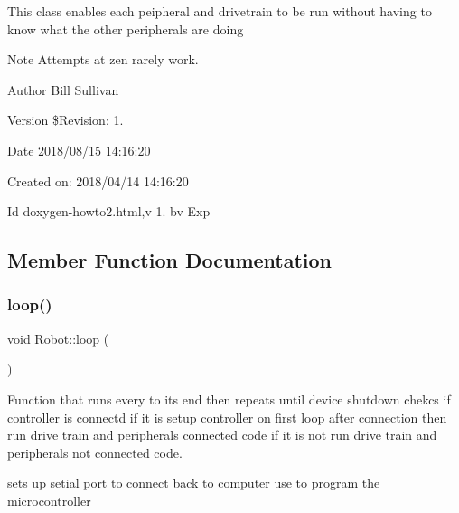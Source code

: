 This class enables each peipheral and drivetrain to be run without having to know what the other peripherals are doing

\begin{DoxyNote}{Note}
Attempts at zen rarely work.
\end{DoxyNote}
\begin{DoxyAuthor}{Author}
Bill Sullivan
\end{DoxyAuthor}
\begin{DoxyVersion}{Version}
\$\+Revision\+: 1.
\end{DoxyVersion}
\begin{DoxyDate}{Date}
2018/08/15 14\+:16\+:20
\end{DoxyDate}
Created on\+: 2018/04/14 14\+:16\+:20

\begin{DoxyParagraph}{Id}
doxygen-\/howto2.\+html,v 1. bv Exp 
\end{DoxyParagraph}


\subsection{Member Function Documentation}
\mbox{\label{class_robot_ad92e1e27045a02533f55ecab2b16d368}} 
\subsubsection{\texorpdfstring{loop()}{loop()}}
{\footnotesize\ttfamily void Robot\+::loop (\begin{DoxyParamCaption}{ }\end{DoxyParamCaption})\hspace{0.3cm}{\ttfamily [inline]}}



Function that runs every to its end then repeats until device shutdown chekcs if controller is connectd if it is setup controller on first loop after connection then run drive train and peripheral\textquotesingle{}s connected code if it is not run drive train and peripheral\textquotesingle{}s not connected code. 

sets up setial port to connect back to computer use to program the microcontroller \mbox{\label{class_robot_aca73cd3e3582f49cc0b33ee900cbc245}} 
